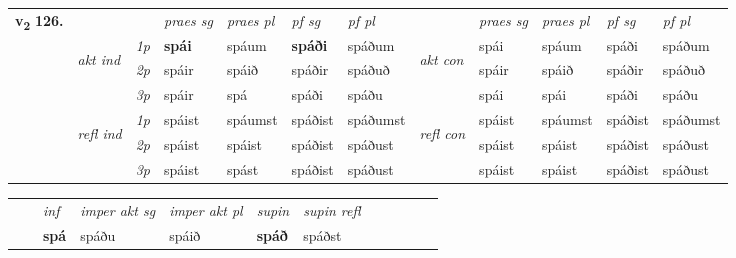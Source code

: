 \begin{tabular}{llllllllllll} \toprule
\multirow{4}{*}{{{\textbf{v{\textsubscript{2}}} \Large{\textbf{126.}}}}}  & &   &  \textit{praes sg}  & \textit{praes pl}  &\textit{ pf sg} & \textit{pf pl} &  &  \textit{praes sg}  & \textit{praes pl}  & \textit{pf sg} & \textit{pf pl } \\*
	\cmidrule{4-7} \cmidrule{9-12}
 & \multirow{3}{*}{\begin{turn}{90}\textit{akt ind}\end{turn}} & {\textit{1p}} & \textbf{spái} & spáum    & \textbf{spáði} & spáðum & \multirow{3}{*}{\begin{turn}{90}\textit{akt con}\end{turn}} &spái & spáum & spáði & spáðum\\*
& &  {\textit{2p}} &  spáir  & spáið   & spáðir & spáðuð & & spáir & spáið & spáðir & spáðuð \\*
& &  {\textit{3p}} & spáir & spá   & spáði & spáðu & & spái & spái& spáði & spáðu  \\*
\cmidrule{4-7} \cmidrule{9-12}
 &\multirow{3}{*}{\begin{turn}{90}\textit{refl ind}\end{turn}} & {\textit{1p}} & spáist & spáumst    & spáðist & spáðumst & \multirow{3}{*}{\begin{turn}{90}\textit{refl con}\end{turn}}  &spáist & spáumst & spáðist & spáðumst\\*
 &&  {\textit{2p}} &  spáist  & spáist   & spáðist & spáðust & &spáist & spáist & spáðist & spáðust \\*
& &  {\textit{3p}} & spáist & spást   & spáðist & spáðust & & spáist & spáist& spáðist & spáðust  \\*
\cmidrule{4-7} \cmidrule{9-12}
\end{tabular}


\begin{tabular}{llllllllllll}
 & & \textit{inf} & \textit{imper akt sg} & \textit{imper akt pl}    & \textit{supin} & \textit{supin refl}      \\*
  & & \textbf{spá} & spáðu  & spáið    &  \textbf{spáð} & spáðst  \\*
\cmidrule{1-12}
\end{tabular}



